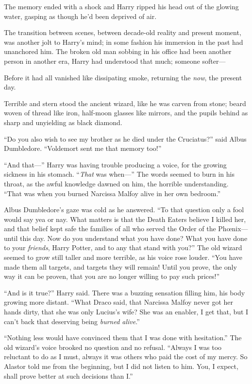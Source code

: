 \later

The memory ended with a shock and Harry ripped his head out of the glowing water, gasping as though he’d been deprived of air.

The transition between scenes, between decade-old reality and present moment, was another jolt to Harry’s mind; in some fashion his immersion in the past had unanchored him. The broken old man sobbing in his office had been another person in another era, Harry had understood that much; someone softer—

Before it had all vanished like dissipating smoke, returning the \emph{now}, the present day.

Terrible and stern stood the ancient wizard, like he was carven from stone; beard woven of thread like iron, half-moon glasses like mirrors, and the pupils behind as sharp and unyielding as black diamond.

“Do you also wish to see my brother as he died under the Cruciatus?” said Albus Dumbledore.
“Voldemort sent me that memory too!”

“And that—” Harry was having trouble producing a voice, for the growing sickness in his stomach. “\emph{That} was when—” The words seemed to burn in his throat, as the awful knowledge dawned on him, the horrible understanding.
“That was when you burned Narcissa Malfoy alive in her own bedroom.”

Albus Dumbledore’s gaze was cold as he answered.
“To that question only a fool would say yea or nay. What matters is that the Death Eaters believe I killed her, and that belief kept safe the families of all who served the Order of the Phœnix—until this day. Now do you understand what you have done? What you have done to your \emph{friends}, Harry Potter, and to any that stand with you?” The old wizard seemed to grow still taller and more terrible, as his voice rose louder.
“You have made them all targets, and targets they will remain! Until you prove, the only way it can be proven, that you are no longer willing to pay such prices!”

“And is it true?” Harry said. There was a buzzing sensation filling him, his body growing more distant.
“What Draco said, that Narcissa Malfoy never got her hands dirty, that she was only Lucius’s wife? She was an enabler, I get that, but I can’t back that deserving being \emph{burned alive}.”

“Nothing less would have convinced them that I was done with hesitation.” The old wizard’s voice brooked no question and no refusal.
“Always I was too reluctant to do as I must, always it was others who paid the cost of my mercy. So Alastor told me from the beginning, but I did not listen to him. You, I expect, shall prove better at such decisions than I.”

